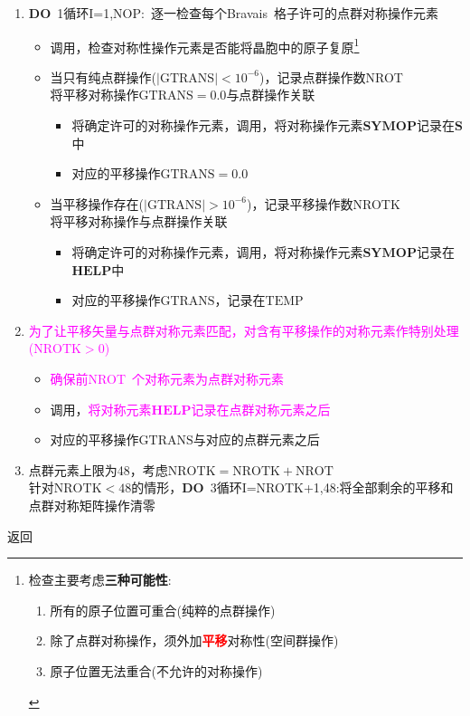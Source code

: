 \documentclass{article}      %
\begin{document}
\begin{enumerate}
	\item \textbf{DO}~1循环\textrm{I}=1,\textrm{NOP}:~逐一检查每个\textrm{Bravais~}格子许可的点群对称操作元素\\
\begin{itemize}
	\item 调用，检查对称性操作元素是否能将晶胞中的原子复原\footnote{
检查主要考虑\textbf{三种可能性}:
\begin{enumerate}
	\item 所有的原子位置可重合(纯粹的点群操作)
	\item 除了点群对称操作，须外加\textcolor{red}{\textbf{平移}}对称性(空间群操作)
	\item 原子位置无法重合(不允许的对称操作)
\end{enumerate}}
	\item 当只有纯点群操作($|\mathrm{GTRANS}|<10^{-6}$)，记录点群操作数\textrm{NROT}\\
		将平移对称操作$\mathrm{GTRANS}=0.0$与点群操作关联
		\begin{itemize}
			\item 将确定许可的对称操作元素，调用，将对称操作元素$\mathbf{SYMOP}$记录在$\mathbf{S}$中
			\item 对应的平移操作$\mathrm{GTRANS}=0.0$
		\end{itemize}
	\item 当平移操作存在($|\mathrm{GTRANS}|>10^{-6}$)，记录平移操作数\textrm{NROTK}\\
		将平移对称操作与点群操作关联
		\begin{itemize}
			\item 将确定许可的对称操作元素，调用，将对称操作元素$\mathbf{SYMOP}$记录在$\mathbf{HELP}$中
			\item 对应的平移操作$\mathrm{GTRANS}$，记录在$\mathrm{TEMP}$
		\end{itemize}
\end{itemize}
\item \textcolor{magenta}{为了让平移矢量与点群对称元素匹配，对含有平移操作的对称元素作特别处理($\mathrm{NROTK}>0$)}
	\begin{itemize}
		\item \textcolor{magenta}{确保前\textrm{NROT}~个对称元素为点群对称元素}
		\item 调用，\textcolor{magenta}{将对称元素$\mathbf{HELP}$记录在点群对称元素之后}
		\item 对应的平移操作$\mathrm{GTRANS}$与对应的点群元素之后
	\end{itemize}
\item 点群元素上限为48，考虑$\mathrm{NROTK}=\mathrm{NROTK}+\mathrm{NROT}$\\
	针对$\mathrm{NROTK}<48$的情形，\textbf{DO}~3循环\textrm{I}=\textrm{NROTK}+1,48:将全部剩余的平移和点群对称矩阵操作清零
\end{enumerate}
返回
\end{document}
